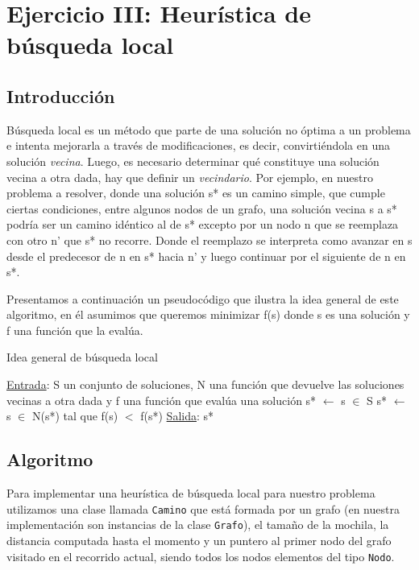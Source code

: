 \section{Ejercicio III: Heur\'istica de b\'usqueda local}

\subsection{Introducci\'on}
\label{sec:ej3_intro}

B\'usqueda local es un m\'etodo que parte de una soluci\'on no \'optima a un problema e intenta mejorarla a trav\'es de modificaciones, es decir, convirti\'endola en una soluci\'on \textit{vecina}. Luego, es necesario determinar qu\'e constituye una soluci\'on vecina a otra dada, hay que definir un \textit{vecindario}. Por ejemplo, en nuestro problema a resolver, donde una soluci\'on s* es un camino simple, que cumple ciertas condiciones, entre algunos nodos de un grafo, una soluci\'on vecina s a s* podr\'ia ser un camino id\'entico al de s* excepto por un nodo n que se reemplaza con otro n' que s* no recorre. Donde el reemplazo se interpreta como avanzar en s desde el predecesor de n en s* hacia n' y luego continuar por el siguiente de n en s*.

Presentamos a continuaci\'on un pseudoc\'odigo que ilustra la idea general de este algoritmo, en \'el asumimos que queremos minimizar f(s) donde s es una soluci\'on y f una funci\'on que la eval\'ua.

\begin{algorithm}[H]
\label{}
\caption{Idea general de b\'usqueda local}
\begin{algorithmic}[1]
\Statex \underline{Entrada}: S un conjunto de soluciones, N una funci\'on que devuelve las soluciones vecinas a otra dada y f una funci\'on que eval\'ua una soluci\'on
\medskip
\State s* $\gets$ s $\in$ S
    \State s* $\gets$ s $\in$ N(s*) tal que f(s) $<$ f(s*)
\EndWhile
\medskip
\Statex \underline{Salida}: s*
\end{algorithmic}
\end{algorithm}

\subsection{Algoritmo}

Para implementar una heur\'istica de b\'usqueda local para nuestro problema utilizamos una clase llamada \texttt{Camino} que est\'a formada por un grafo (en nuestra implementaci\'on son instancias de la clase \texttt{Grafo}), el tamaño de la mochila, la distancia computada hasta el momento y un puntero al primer nodo del grafo visitado en el recorrido actual, siendo todos los nodos elementos del tipo \texttt{Nodo}.

